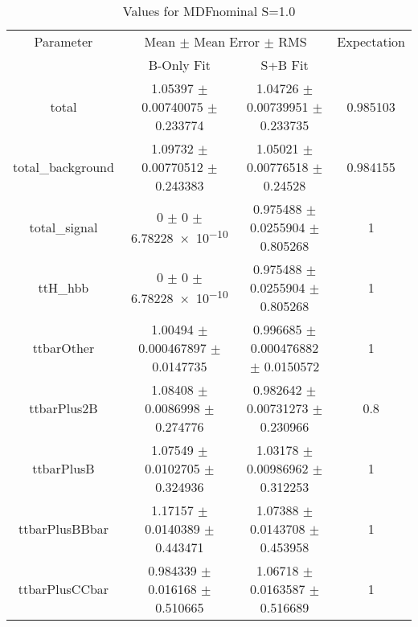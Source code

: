 \begin{table}
\centering
\caption{Values for MDFnominal S=1.0}
\begin{tabular}{cccc}
\toprule
Parameter & \multicolumn{2}{c}{Mean $\pm$ Mean Error $\pm$ RMS} & Expectation\\
 & B-Only Fit & S+B Fit & \\
\midrule
total & \num{1.05397} $\pm$ \num{0.00740075} $\pm$ \num{0.233774} & \num{1.04726} $\pm$ \num{0.00739951} $\pm$ \num{0.233735} & \num{0.985103}\\
total\_background & \num{1.09732} $\pm$ \num{0.00770512} $\pm$ \num{0.243383} & \num{1.05021} $\pm$ \num{0.00776518} $\pm$ \num{0.24528} & \num{0.984155}\\
total\_signal & \num{0} $\pm$ \num{0} $\pm$ \num{6.78228e-10} & \num{0.975488} $\pm$ \num{0.0255904} $\pm$ \num{0.805268} & \num{1}\\
ttH\_hbb & \num{0} $\pm$ \num{0} $\pm$ \num{6.78228e-10} & \num{0.975488} $\pm$ \num{0.0255904} $\pm$ \num{0.805268} & \num{1}\\
ttbarOther & \num{1.00494} $\pm$ \num{0.000467897} $\pm$ \num{0.0147735} & \num{0.996685} $\pm$ \num{0.000476882} $\pm$ \num{0.0150572} & \num{1}\\
ttbarPlus2B & \num{1.08408} $\pm$ \num{0.0086998} $\pm$ \num{0.274776} & \num{0.982642} $\pm$ \num{0.00731273} $\pm$ \num{0.230966} & \num{0.8}\\
ttbarPlusB & \num{1.07549} $\pm$ \num{0.0102705} $\pm$ \num{0.324936} & \num{1.03178} $\pm$ \num{0.00986962} $\pm$ \num{0.312253} & \num{1}\\
ttbarPlusBBbar & \num{1.17157} $\pm$ \num{0.0140389} $\pm$ \num{0.443471} & \num{1.07388} $\pm$ \num{0.0143708} $\pm$ \num{0.453958} & \num{1}\\
ttbarPlusCCbar & \num{0.984339} $\pm$ \num{0.016168} $\pm$ \num{0.510665} & \num{1.06718} $\pm$ \num{0.0163587} $\pm$ \num{0.516689} & \num{1}\\
\bottomrule
\end{tabular}
\end{table}